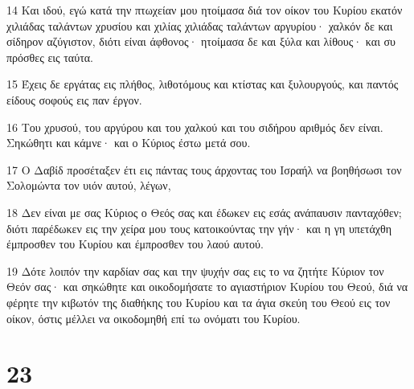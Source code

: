 \par 14 Και ιδού, εγώ κατά την πτωχείαν μου ητοίμασα διά τον οίκον του Κυρίου εκατόν χιλιάδας ταλάντων χρυσίου και χιλίας χιλιάδας ταλάντων αργυρίου· χαλκόν δε και σίδηρον αζύγιστον, διότι είναι άφθονος· ητοίμασα δε και ξύλα και λίθους· και συ πρόσθες εις ταύτα.
\par 15 Έχεις δε εργάτας εις πλήθος, λιθοτόμους και κτίστας και ξυλουργούς, και παντός είδους σοφούς εις παν έργον.
\par 16 Του χρυσού, του αργύρου και του χαλκού και του σιδήρου αριθμός δεν είναι. Σηκώθητι και κάμνε· και ο Κύριος έστω μετά σου.
\par 17 Ο Δαβίδ προσέταξεν έτι εις πάντας τους άρχοντας του Ισραήλ να βοηθήσωσι τον Σολομώντα τον υιόν αυτού, λέγων,
\par 18 Δεν είναι με σας Κύριος ο Θεός σας και έδωκεν εις εσάς ανάπαυσιν πανταχόθεν; διότι παρέδωκεν εις την χείρα μου τους κατοικούντας την γήν· και η γη υπετάχθη έμπροσθεν του Κυρίου και έμπροσθεν του λαού αυτού.
\par 19 Δότε λοιπόν την καρδίαν σας και την ψυχήν σας εις το να ζητήτε Κύριον τον Θεόν σας· και σηκώθητε και οικοδομήσατε το αγιαστήριον Κυρίου του Θεού, διά να φέρητε την κιβωτόν της διαθήκης του Κυρίου και τα άγια σκεύη του Θεού εις τον οίκον, όστις μέλλει να οικοδομηθή επί τω ονόματι του Κυρίου.

\chapter{23}

